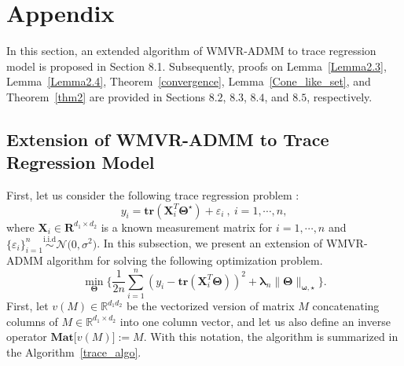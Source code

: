 \documentclass[alpha-refs]{wiley-article}
\begin{document}


\newpage
\section{Appendix}
In this section, an extended algorithm of WMVR-ADMM to trace regression model is proposed in Section 8.1.
Subsequently, proofs on Lemma~\ref{Lemma2.3}, Lemma~\ref{Lemma2.4}, Theorem~\ref{convergence}, Lemma~\ref{Cone_like_set}, and Theorem~\ref{thm2} are provided in Sections $8.2$, $8.3$, $8.4$, and $8.5$, respectively.

\subsection{Extension of WMVR-ADMM to Trace Regression Model} \label{tr_algo}
First, let us consider the following trace regression problem :
\begin{equation*}
    y_{i} = \textbf{tr}(\boldsymbol{X}^{T}_{i}\boldsymbol{\Theta^\star}) + \varepsilon_{i} \ ,\ i = 1, \cdots, n, \label{eq: TR}
\end{equation*}
where $\boldsymbol{X}_{i} \in \boldsymbol{R}^{d_{1} \times d_{2}}$ is a known measurement matrix for $i = 1, \cdots, n$ and $\big\{\varepsilon_{i}\big\}_{i=1}^{n}\stackrel{\text{i.i.d}}{\sim} \mathcal{N}\big( 0, \sigma^{2} \big)$.
In this subsection, we present an extension of WMVR-ADMM algorithm for solving the following optimization problem.
\begin{equation*}
    \min_{\boldsymbol{\Theta}} \Bigg\{ \frac{1}{2n}\sum^{n}_{i=1} (y_{i} - \textbf{tr}(\boldsymbol{X}^{T}_{i}\boldsymbol{\Theta}))^2 + \boldsymbol{\lambda}_{n} \|\boldsymbol{\Theta}\|_{\boldsymbol{\omega,\star}} \Bigg\}. \label{eq: opt}
\end{equation*}
First, let $v(M)\in\mathbb{R}^{d_{1}d_{2}}$ be the vectorized version of matrix $M$ concatenating columns of $M\in\mathbb{R}^{d_{1} \times d_{2}}$ into one column vector, and let us also define an inverse operator $\textbf{Mat} \big[ v(M) \big] := M$.
With this notation, the algorithm is summarized in the Algorithm~\ref{trace_algo}.
\end{document}
